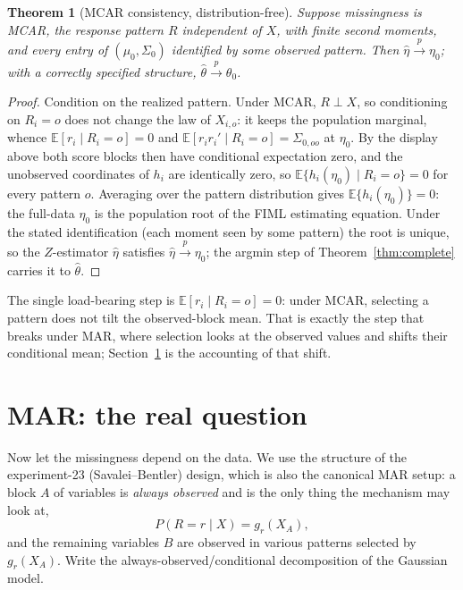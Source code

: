 \documentclass[11pt]{article}
\newcommand{\E}{\mathbb{E}}
\theoremstyle{plain}
\newtheorem{theorem}{Theorem}
\theoremstyle{remark}
\begin{document}
\begin{theorem}[MCAR consistency, distribution-free]\label{thm:mcar}
Suppose missingness is MCAR, the response pattern $R$ independent of $X$, with
finite second moments, and every entry of $(\mu_0,\Sigma_0)$ identified by some
observed pattern. Then $\hat\eta\xrightarrow{p}\eta_0$; with a correctly
specified structure, $\hat\theta\xrightarrow{p}\theta_0$.
\end{theorem}

\begin{proof}
Condition on the realized pattern. Under MCAR, $R\perp X$, so conditioning on
$R_i=o$ does not change the law of $X_{i,o}$: it keeps the population marginal,
whence $\E[r_i\mid R_i=o]=0$ and $\E[r_i r_i'\mid R_i=o]=\Sigma_{0,oo}$ at
$\eta_0$. By the display above both score blocks then have conditional
expectation zero, and the unobserved coordinates of $h_i$ are identically zero,
so $\E\{h_i(\eta_0)\mid R_i=o\}=0$ for every pattern $o$. Averaging over the
pattern distribution gives $\E\{h_i(\eta_0)\}=0$: the full-data $\eta_0$ is the
population root of the FIML estimating equation. Under the stated identification
(each moment seen by some pattern) the root is unique, so the $Z$-estimator
$\hat\eta$ satisfies $\hat\eta\xrightarrow{p}\eta_0$; the argmin step of
Theorem~\ref{thm:complete} carries it to $\hat\theta$.
\end{proof}

The single load-bearing step is $\E[r_i\mid R_i=o]=0$: under MCAR, selecting a
pattern does not tilt the observed-block mean. That is exactly the step that
breaks under MAR, where selection looks at the observed values and shifts their
conditional mean; Section~\ref{sec:mar} is the accounting of that shift.

\section{MAR: the real question}\label{sec:mar}

Now let the missingness depend on the data. We use the structure of the
experiment-23 (Savalei--Bentler) design, which is also the canonical MAR setup:
a block $A$ of variables is \emph{always observed} and is the only thing the
mechanism may look at,
\[
  P(R=r\mid X) = g_r(X_A),
\]
and the remaining variables $B$ are observed in various patterns selected by
$g_r(X_A)$. Write the always-observed/conditional decomposition of the Gaussian
model.
\end{document}
